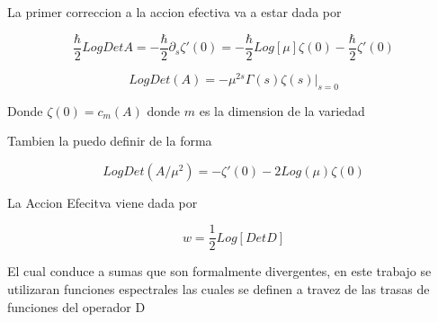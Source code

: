 La primer correccion a la accion efectiva va a estar dada por 

\begin{equation}
\frac{\hbar}{2} Log Det A = - \frac{\hbar}{2} \partial _s \zeta' (0) =
- \frac{\hbar}{2} Log[ \mu ] \zeta (0) - \frac{\hbar}{2} \zeta '(0) 
\end{equation}

\begin{equation}
Log Det (A) = 
- \mu ^{2s}  \Gamma (s) \zeta (s) | _{s=0}
\end{equation} 

Donde $\zeta (0) = c _m (A) $ donde $m$ es la dimension de la variedad 

Tambien la puedo definir de la forma

\begin{equation}
Log Det (A/ \mu ^2) = 
- \zeta ' (0) - 2 Log ( \mu ) \zeta (0)
\end{equation}




La Accion Efecitva viene dada por

\begin{equation}
w = \frac{1}{2} Log[Det D]
\end{equation}

El cual conduce a sumas que son formalmente divergentes, en este trabajo se utilizaran funciones espectrales las cuales se definen a travez de las trasas de funciones del operador D \\






